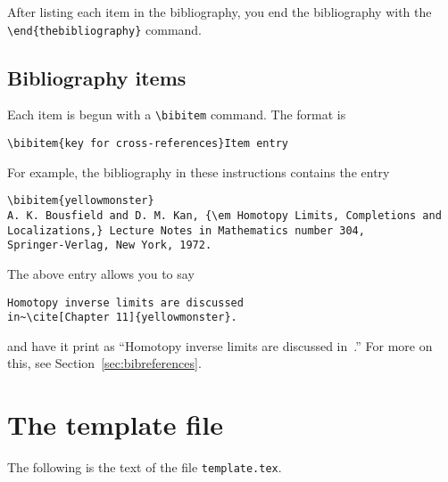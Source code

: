 After listing each item in the bibliography, you end the bibliography
with the \verb"\end{thebibliography}" command.


\subsection{Bibliography items}

Each item is begun with a \verb"\bibitem" command.  The format is
\begin{center}
\verb"\bibitem{key for cross-references}Item entry"
\end{center}
For example, the bibliography in these instructions contains the
entry
%
\begin{verbatim}
\bibitem{yellowmonster}
A. K. Bousfield and D. M. Kan, {\em Homotopy Limits, Completions and
Localizations,} Lecture Notes in Mathematics number 304,
Springer-Verlag, New York, 1972.
\end{verbatim}


The above entry allows you to say
\begin{verbatim}
Homotopy inverse limits are discussed
in~\cite[Chapter 11]{yellowmonster}.
\end{verbatim}
and have it print as
``Homotopy inverse limits are discussed
in~\cite[Chapter 11]{yellowmonster}.''
For more on this, see Section~\ref{sec:bibreferences}.

















\section{The template file}
\label{sec:template}

The following is the text of the file \verb"template.tex".

